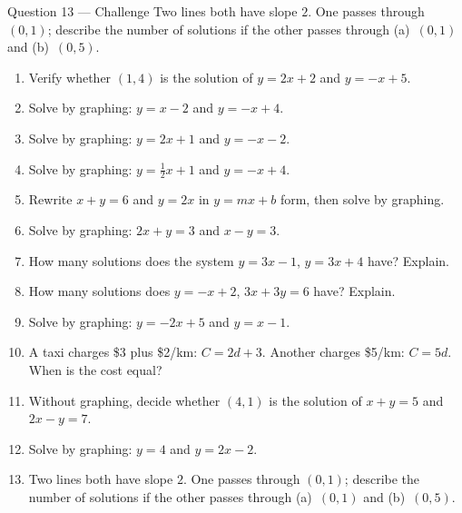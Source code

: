 \documentclass[11pt]{article}
\begin{document}
\begin{qbox}{Question 13 --- Challenge}
Two lines both have slope $2$. One passes through $(0,1)$; describe the number of solutions if the other passes through (a)~$(0,1)$ and (b)~$(0,5)$.\workspace{2.8cm}
\end{qbox}

\clearpage
{}

\begin{recapbox}
\begin{multicols}{2}
\small
\begin{enumerate}[leftmargin=*,itemsep=3pt]
  \item Verify whether $(1,4)$ is the solution of $y=2x+2$ and $y=-x+5$.
  \item Solve by graphing: $y=x-2$ and $y=-x+4$.
  \item Solve by graphing: $y=2x+1$ and $y=-x-2$.
  \item Solve by graphing: $y=\tfrac12x+1$ and $y=-x+4$.
  \item Rewrite $x+y=6$ and $y=2x$ in $y=mx+b$ form, then solve by graphing.
  \item Solve by graphing: $2x+y=3$ and $x-y=3$.
  \item How many solutions does the system $y=3x-1$, $y=3x+4$ have? Explain.
  \item How many solutions does $y=-x+2$, $3x+3y=6$ have? Explain.
  \item Solve by graphing: $y=-2x+5$ and $y=x-1$.
  \item A taxi charges \$3 plus \$2/km: $C=2d+3$. Another charges \$5/km: $C=5d$. When is the cost equal?
  \item Without graphing, decide whether $(4,1)$ is the solution of $x+y=5$ and $2x-y=7$.
  \item Solve by graphing: $y=4$ and $y=2x-2$.
  \item Two lines both have slope $2$. One passes through $(0,1)$; describe the number of solutions if the other passes through (a)~$(0,1)$ and (b)~$(0,5)$.
\end{enumerate}
\end{multicols}
\end{recapbox}
\end{document}
